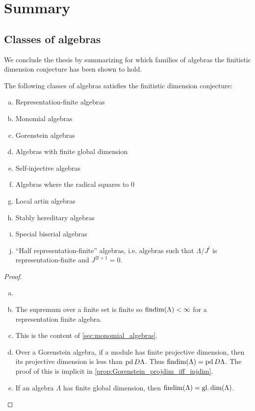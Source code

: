 \section{Summary}\label{sec:summary}
\subsection{Classes of algebras}

We conclude the thesis by summarizing for which families of algebras the finitistic dimension conjecture has been shown to hold.

\begin{theorem}\label{thm:findim_summary}
	The following classes of algebras satisfies the finitistic dimension conjecture:
	\begin{enumerate}[a)]
		\item Representation-finite algebras
		\item Monomial algebras
		\item Gorenstein algebras
		\item Algebras with finite global dimension
		\item Self-injective algebras
		\item Algebras where the radical squares to 0
		\item Local artin algebras
		\item Stably hereditary algebras
		\item Special biserial algebras
		\item ``Half representation-finite'' algebras, i.e. algebras such that $\Lambda/J^l$ is representation-finite and $J^{2l+1}=0$.
	\end{enumerate}
	\begin{proof}
		\begin{enumerate}[(a)]
			\item[]
			\item The supremum over a finite set is finite so $\operatorname{findim}(\Lambda) < \infty$ for a representation finite algebra.
			\item This is the content of \cref{sec:monomial_algebras}.
			\item Over a Gorenstein algebra, if a module has finite projective dimension, then its projective dimension is less than $\operatorname{pd} D\Lambda$. Thus $\operatorname{findim}(\Lambda)=\operatorname{pd} D\Lambda$. The proof of this is implicit in \cref{prop:Gorenstein_projdim_iff_injdim}.
			\item If an algebra $\Lambda$ has finite global dimension, then $\operatorname{findim}(\Lambda) = \operatorname{gl.dim}(\Lambda)$.

\end{enumerate}
\end{proof}
\end{theorem}
